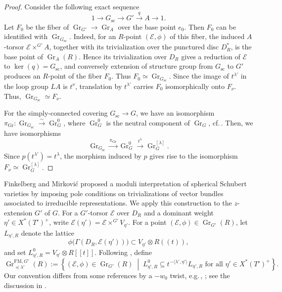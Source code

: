 \documentclass[a4paper, 12pt]{amsart}
\theoremstyle{definition}
\DeclareMathOperator{\Gr}{\mathrm{Gr}}
\begin{document}
\begin{proof}
Consider the following exact sequence
\[
1\to G_{\mathrm{sc}}\to G'\xrightarrow{q}A\to1 .
\]
Let $F_0$ be the fiber of $\Gr_{G'}\to\Gr_A$ over the base point
$e_0$. Then  $F_0$  can be identified with $\Gr_{G_{\mathrm{sc}}}$.
 Indeed, for an $R$-point $(\mathscr E,\phi)$ of this fiber, the induced $A$-torsor $\mathscr E\times^{G'}A$, together with its trivialization over the punctured disc $D^*_R$, is the base point of $\Gr_A(R)$. Hence its
trivialization over $D_R$ gives a reduction of $\mathscr E$ to $\ker(q)=G_{\mathrm{sc}}$, and conversely extension of structure group
from $G_{\mathrm{sc}}$ to $G'$ produces an $R$-point of the fiber $F_0$. Thus $F_0\simeq\Gr_{G_{\mathrm{sc}}}$.
Since the image of $t^{\lambda'}$ in the loop group $LA$ is $t^\nu$, translation by
$t^{\lambda'}$ carries $F_0$ isomorphically onto $F_\nu$. Thus,  $\Gr_{G_{\mathrm{sc}}}\simeq F_\nu$.

For the simply-connected covering
$G_{\mathrm{sc}}\to G$, we have an isomorphism $\pi_{\Gr}:\Gr_{G_{\mathrm{sc}}}  \xrightarrow{\sim} \Gr_G^0$, 
where  $\Gr_G^0$ is the neutral component of $\Gr_G$, cf.\,\cite[Theorem 1.3.11(3)]{ZhuPCMI}. Then, we have isomorphisms
\begin{equation}\label{eq:j_lambda}
\Gr_{G_{\mathrm{sc}}} \xrightarrow{\pi_{\Gr}} \Gr_G^0
\xrightarrow{\ t^\lambda\ }\Gr_G^{[\lambda]}.
\end{equation}
Since $p(t^{\lambda'})=t^\lambda$,  the morphism induced by $p$ gives rise to the isomorphism $F_\nu\simeq \Gr_{G}^{[\lambda]}$.
\end{proof}



Finkelberg and Mirkovi\'c \cite{FM} proposed a moduli interpretation of
spherical Schubert varieties by imposing pole conditions on trivializations of vector bundles associated to irreducible
representations. We apply this construction to the $z$-extension $G'$ of $G$. For a $G'$-torsor $\mathscr E$ over $D_R$ and a dominant
weight $\eta'\in X^*(T')^+$, write
$\mathscr E(\eta')=\mathscr E\times^{G'}V_{\eta'}$. For a point
$(\mathscr E,\phi)\in\Gr_{G'}(R)$, let $L_{\eta',R}$ denote the lattice
\[
\phi\bigl(\Gamma(D_R,\mathscr E(\eta'))\bigr)
\subset V_{\eta'}\otimes R((t)),
\]
and set $L^0_{\eta',R}=V_{\eta'}\otimes R[[t]]$.
Following \cite[Section~4.1]{BHY}, define
\begin{equation}\label{eq:zfm-upstairs}
\Gr^{\mathrm{FM},G'}_{\preceq\lambda'}(R)
:=
\left\{(\mathscr E,\phi)\in\Gr_{G'}(R)\;\middle|\;
L^0_{\eta',R}\subseteq
 t^{-\langle\lambda',\eta'\rangle}L_{\eta',R}
\text{ for all }\eta'\in X^*(T')^+\right\}.
\end{equation}
Our convention differs from some references by a $-w_0$ twist, e.g.\,\cite[\S2.3]{KMW}, \cite[Remark~2.1.7]{ZhuPCMI}; see the discussion in \cite[Remark~4.2]{BHY}. 
\end{document}
